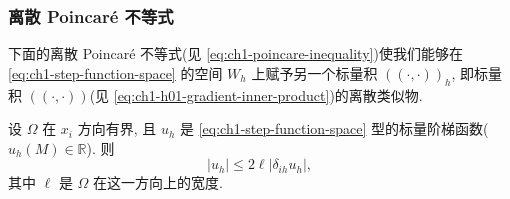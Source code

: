 \subsubsection{离散 Poincaré 不等式}
\label{subsubsec:ch1-discrete-poincare}

下面的离散 Poincaré 不等式(见 \eqref{eq:ch1-poincare-inequality})使我们能够在 \eqref{eq:ch1-step-function-space} 的空间 $W_h$ 上赋予另一个标量积 $((\cdot,\cdot))_h$, 即标量积 $((\cdot,\cdot))$(见 \eqref{eq:ch1-h01-gradient-inner-product})的离散类似物.

\begin{Proposition}
\label{prop:ch1-discrete-poincare}
设 $\Omega$ 在 $x_i$ 方向有界, 且 $u_h$ 是 \eqref{eq:ch1-step-function-space} 型的标量阶梯函数($u_h(M)\in\mathbb R$). 则
\begin{equation}
|u_h|\leq2\ell|\delta_{ih}u_h|,
\label{eq:ch1-discrete-poincare-inequality}
\end{equation}
其中 $\ell$ 是 $\Omega$ 在这一方向上的宽度.
\end{Proposition}

